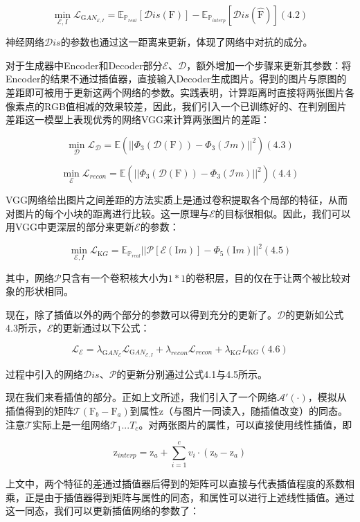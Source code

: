 \documentclass[UTF8,a4paper，12pt]{article}
\def\MC {\mathcal}
\theoremstyle{theorem}
\theoremstyle{definition}
\begin{document}
$$\min_{\MC E,I} \MC L_{\mathrm GAN_{\MC E,I}} = \mathbb E_{\mathbb P_{real}}[\MC Dis(\mathrm F)] - \mathbb E_{\mathbb P_{interp}}[\MC Dis(\hat{\mathrm F})]    (4.2)$$

神经网络$\MC Dis$的参数也通过这一距离来更新，体现了网络中对抗的成分。

对于生成器中Encoder和Decoder部分$\MC E$、$\MC D$，额外增加一个步骤来更新其参数：将Encoder的结果不通过插值器，直接输入Decoder生成图片。得到的图片与原图的差距即可被用于更新这两个网络的参数。实践表明，计算距离时直接将两张图片各像素点的RGB值相减的效果较差，因此，我们引入一个已训练好的、在判别图片差距这一模型上表现优秀的网络VGG来计算两张图片的差距：

$$\min_{\MC D} \MC L_{\MC D} = \mathbb E(||\Phi_3(\MC D(\mathrm F)) - \Phi_3(\MC Im)||^2)    (4.3)$$

$$\min_{\MC E} \MC L_{recon} = \mathbb E(||\Phi_3(\MC D(\mathrm F)) - \Phi_3(\MC Im)||^2)    (4.4)$$

VGG网络给出图片之间差距的方法实质上是通过卷积提取各个局部的特征，从而对图片的每个小块的距离进行比较。这一原理与$\MC E$的目标很相似。因此，我们可以用VGG中更深层的部分来更新$\MC E$的参数：

$$\min_{\MC E,I} \MC L_{\mathrm KG} = \mathbb E_{\mathbb P_{real}}||\MC P[\MC E(\mathrm Im)] - \Phi_5(\mathrm Im)||^2    (4.5)$$

其中，网络$\MC P$只含有一个卷积核大小为$1*1$的卷积层，目的仅在于让两个被比较对象的形状相同。

现在，除了插值以外的两个部分的参数可以得到充分的更新了。$\MC D$的更新如公式4.3所示，$\MC E$的更新通过以下公式：

$$\MC L_{\MC E} = \lambda_{\mathrm GAN_{\MC E}}\MC L_{\mathrm GAN_{\MC E,I}} + \lambda_{recon}\MC L_{recon} + \lambda_{\mathrm KG}L_{\mathrm KG}    (4.6)$$

过程中引入的网络$\MC Dis$、$\MC P$的更新分别通过公式4.1与4.5所示。

现在我们来看插值的部分。正如上文所述，我们引入了一个网络$\MC A'(\cdot)$，模拟从插值得到的矩阵$\MC T(\mathrm F_b - \mathrm F_a)$到属性$\mathrm z$（与图片一同读入，随插值改变）的同态。注意$\MC T$实际上是一组网络$\MC T_1...T_c$。对两张图片的属性，可以直接使用线性插值，即

$$\mathrm z_{interp} = \mathrm z_a + \sum_{i=1}^{c}{v_i \cdot (\mathrm z_b - \mathrm z_a)}$$

上文中，两个特征的差通过插值器后得到的矩阵可以直接与代表插值程度的系数相乘，正是由于插值器得到矩阵与属性的同态，和属性可以进行上述线性插值。通过这一同态，我们可以更新插值网络的参数了：
\end{document}
